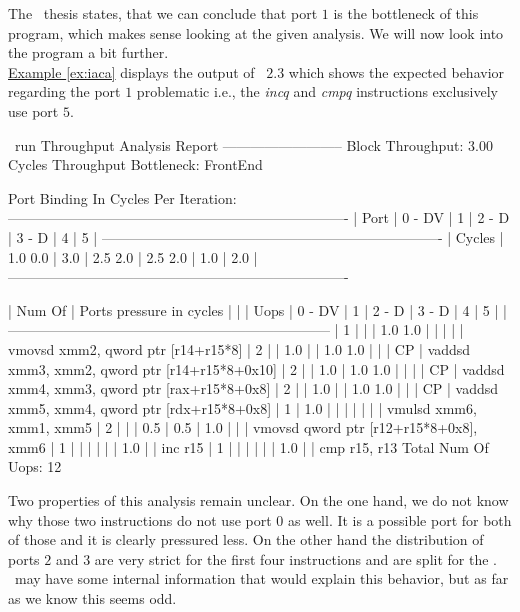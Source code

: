 The \osaca\ thesis states, that we can conclude that port $1$ is the bottleneck of this program, which makes sense looking at the given analysis. We will now look into the program a bit further.\\
\hyperref[ex:iaca]{Example \ref*{ex:iaca}} displays the output of \iaca\ $2.3$ which shows the expected behavior regarding the port $1$ problematic i.e., the \emph{incq} and \emph{cmpq} instructions exclusively use port $5$.

\begin{LabeledExample}{\iaca\ run}{\label{ex:iaca}}
  Throughput Analysis Report
  --------------------------
  Block Throughput: 3.00 Cycles       Throughput Bottleneck: FrontEnd
  
  Port Binding In Cycles Per Iteration:
  -------------------------------------------------------------------------
  |  Port  |  0   -  DV  |  1   |  2   -  D   |  3   -  D   |  4   |  5   |
  -------------------------------------------------------------------------
  | Cycles | 1.0    0.0  | 3.0  | 2.5    2.0  | 2.5    2.0  | 1.0  | 2.0  |
  -------------------------------------------------------------------------
  
      
  | Num Of |              Ports pressure in cycles               |    |
  |  Uops  |  0  - DV  |  1  |  2  -  D  |  3  -  D  |  4  |  5  |    |
  ---------------------------------------------------------------------
  |   1    |           |     | 1.0   1.0 |           |     |     |    | vmovsd xmm2, qword ptr [r14+r15*8]
  |   2    |           | 1.0 |           | 1.0   1.0 |     |     | CP | vaddsd xmm3, xmm2, qword ptr [r14+r15*8+0x10]
  |   2    |           | 1.0 | 1.0   1.0 |           |     |     | CP | vaddsd xmm4, xmm3, qword ptr [rax+r15*8+0x8]
  |   2    |           | 1.0 |           | 1.0   1.0 |     |     | CP | vaddsd xmm5, xmm4, qword ptr [rdx+r15*8+0x8]
  |   1    | 1.0       |     |           |           |     |     |    | vmulsd xmm6, xmm1, xmm5
  |   2    |           |     | 0.5       | 0.5       | 1.0 |     |    | vmovsd qword ptr [r12+r15*8+0x8], xmm6
  |   1    |           |     |           |           |     | 1.0 |    | inc r15
  |   1    |           |     |           |           |     | 1.0 |    | cmp r15, r13
  Total Num Of Uops: 12
\end{LabeledExample}

Two properties of this analysis remain unclear. On the one hand, we do not know why those two instructions do not use port $0$ as well. It is a possible port for both of those and it is clearly pressured less. On the other hand the distribution of ports $2$ and $3$ are very strict for the first four instructions and are split for the . \iaca\ may have some internal information that would explain this behavior, but as far as we know this seems odd.\\

